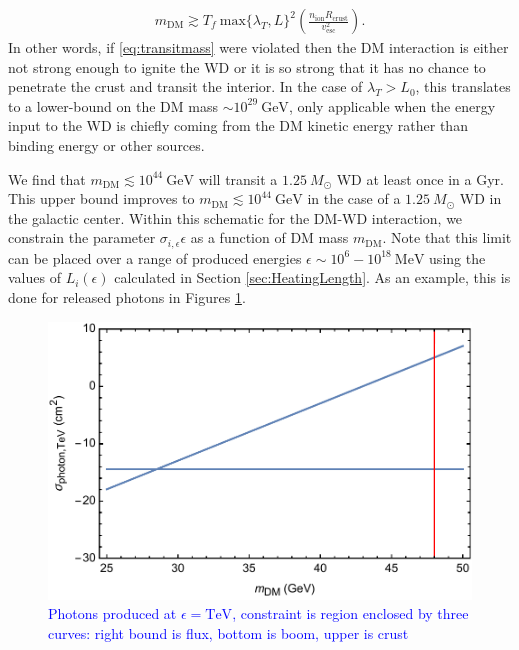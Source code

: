 \documentclass[twocolumn,showpacs,preprintnumbers,amsmath,amssymb,prd]{revtex4}
\newcommand{\GeV}{\text{GeV}}
\def\r{\right)}
\def\l{\left(}
\begin{document}
\begin{align}
\label{eq:transitmass}
m_{\text{DM}} \gtrsim  T_f ~\text{max}\{\lambda_T, L\}^2 \l \frac{n_{\text{ion}} R_{\text{crust}}}{v_{\text{esc}}^2} \r.
\end{align}
In other words, if \eqref{eq:transitmass} were violated then the DM interaction is either not strong enough to ignite the WD or it is so strong that it has no chance to penetrate the crust and transit the interior. In the case of $\lambda_T > L_0$, this translates to a lower-bound on the DM mass $\sim 10^{29} ~\GeV$, only applicable when the energy input to the WD is chiefly coming from the DM kinetic energy rather than binding energy or other sources. 

We find that $m_\text{DM} \lesssim 10^{44} ~\GeV$ will transit a $1.25 ~M_{\odot}$ WD at least once in a Gyr. This upper bound improves to $m_\text{DM} \lesssim 10^{44} ~\GeV$ in the case of a $1.25 ~M_{\odot}$ WD in the galactic center. Within this schematic for the DM-WD interaction, we constrain the parameter $\sigma_{i,\epsilon} \epsilon$ as a function of DM mass $m_\text{DM}$. Note that this limit can be placed over a range of produced energies $\epsilon \sim 10^{6} - 10^{18} ~\text{MeV}$ using the values of $L_i (\epsilon)$ calculated in Section \ref{sec:HeatingLength}. As an example, this is done for released photons in Figures \ref{fig:photonconstraint}. 
\begin{figure}
\includegraphics[scale=.45]{photonconstraint.pdf}
\caption{\textcolor{blue}{Photons produced at $\epsilon = \text{TeV}$, constraint is region enclosed by three curves: right bound is flux, bottom is boom, upper is crust}}
\label{fig:photonconstraint}
\end{figure}
\end{document}
